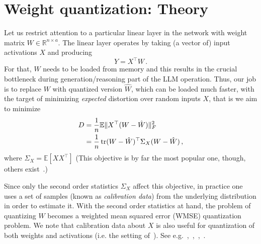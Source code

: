 \documentclass[journal]{IEEEtran}
\newcommand{\RR}{\mathbb{R}}
\newcommand{\trace}{\mathop{\mathrm{tr}}}
\def\tr{\trace}
\def\EE{\mathbb{E}}
\newcommand{\m}{\mathcal}
\begin{document}


\section{Weight quantization: Theory}
\label{sec:weightonly_theory}


Let us restrict attention to a particular linear layer in the network with weight matrix $W\in
\RR^{n\times a}$. The linear layer operates by taking (a vector of) input activations $X$ and
producing
$$ Y = X^\top W\,.$$
For that, $W$ needs to be loaded from memory and this results in the crucial
bottleneck during generation/reasoning part of the LLM operation. Thus, our job is to replace $W$
with quantized version $\hat W$, which can be loaded much faster, with the target of minimizing
\textit{expected} distortion over random inputs $X$, that is we aim to minimize
\begin{align}\label{eq:wot_1}
	D&={1\over n} \EE\|X^\top(W-\hat{W})\|_F^2 \nonumber\\
    &=\frac{1}{n} \tr  (W-\hat W)^\top \Sigma_X (W-\hat W)\,,
\end{align}
where $\Sigma_X=\EE[X X^\top]$ (This objective is by far the most popular one, though, others
exist~\cite{li2021brecq,tseng2025model,badri2023hqq}.)

Since only the second order statistics $\Sigma_X$ affect this objective, in practice one uses
a set of samples (known as \emph{calibration data}) from the underlying distribution in order to
estimate it. With the second order statistics at hand, the problem of quantizing $W$ becomes a
weighted mean squared error (WMSE) quantization problem. We note that calibration data about $X$ is
also useful for quantization of both weights and activations (i.e. the setting of~\cite{OP26part1}). See e.g.~\cite{xiao2023smoothquant},~\cite[Section
4.5]{NestQuant},~\cite{zhang2025qronos},~\cite{zhang2025provable}. 

\end{document}
